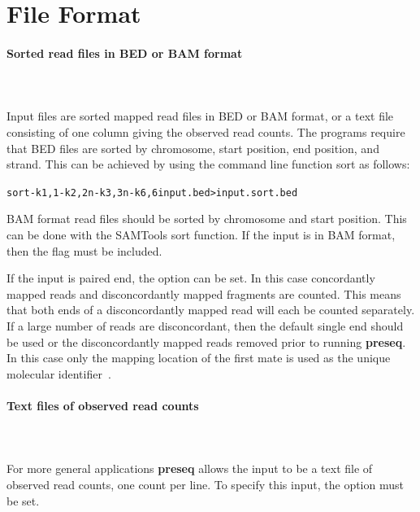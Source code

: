 \documentclass[11pt, titlepage]{article}
\begin{document}
\newpage

\section{File Format}
\label{sec:format}

\paragraph{Sorted read files in BED or BAM format}~\\~\\[-.2cm]
Input files are sorted mapped read files in BED or BAM format,
or a text file consisting of one column giving the observed read counts.
The 
programs require that BED files are sorted by chromosome, 
start position, end position, and strand.  This can be achieved
by using the command line function sort as follows: 
\begingroup \fontsize{9pt}{12pt}\selectfont \begin{alltt}
sort -k 1,1 -k 2,2n -k 3,3n -k 6,6 input.bed > input.sort.bed
\end{alltt}\endgroup
BAM format read files should be sorted by chromosome and
start position.  This can be done with the SAMTools 
sort function. If the input is in BAM format, then the flag
 must be included.  


If the input is paired end, the option  can be set.
In this case concordantly mapped reads and disconcordantly
mapped fragments are counted.  This means that both ends
of a disconcordantly mapped read will each be counted separately.
If a large number of reads are disconcordant, then
the default single end should be used or the disconcordantly
mapped reads removed prior to running \textbf{preseq}.
In this case only the mapping 
location of the first mate
is used as the unique molecular identifier~\cite{kivioja2011counting}.



\paragraph{Text files of observed read counts}~\\~\\[-.2cm]
For more general applications \textbf{preseq} allows the input
to be a text file of observed read counts, one count per
line.   To specify this input, the option  must be set.
\end{document}
